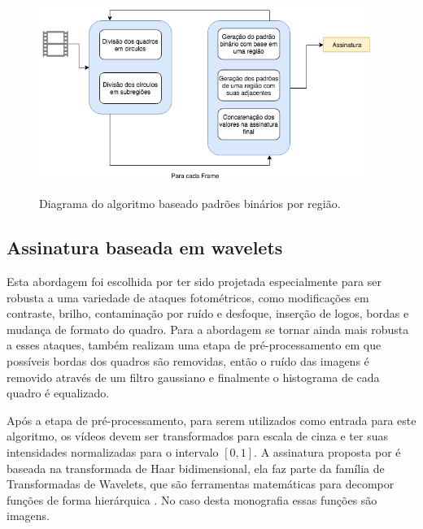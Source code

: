  \begin{figure}[h]
      \centering
      \caption{Diagrama do algoritmo baseado padrões binários por região.}
      \includegraphics[width=0.96\textwidth]{dados/figuras/diagramas/Diag-RBP}
       	\label{fig:dia_rbp}
    \end{figure}  

    
%
%

\subsection{Assinatura baseada em wavelets}
\label{wavelets}

Esta abordagem foi escolhida por ter sido projetada especialmente para ser robusta a uma variedade de ataques fotométricos, como modificações em contraste, brilho, contaminação por ruído e desfoque, inserção de logos, bordas e mudança de formato do quadro. Para a abordagem se tornar ainda mais robusta a esses ataques,  também realizam uma etapa de pré-processamento em que possíveis bordas dos quadros são removidas, então o ruído das imagens é removido através de um filtro gaussiano e finalmente o histograma de cada quadro é equalizado. 

Após a etapa de pré-processamento, para serem utilizados como entrada para este algoritmo, os vídeos devem ser transformados para escala de cinza e ter suas intensidades normalizadas para o intervalo $[0,1]$. A assinatura proposta por  é baseada na transformada de Haar bidimensional, ela faz parte da família de Transformadas de Wavelets, que são ferramentas matemáticas para decompor funções de forma hierárquica \cite{stollnitz1995wavelets}. No caso desta monografia essas funções são imagens. 

